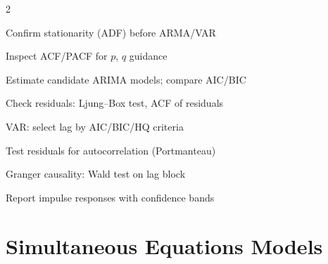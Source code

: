 \documentclass[10pt,a4paper]{article}
\begin{document}
\begin{tcolorbox}[checklist]
\begin{multicols}{2}
\begin{checklist}
  \item Confirm stationarity (ADF) before ARMA/VAR
  \item Inspect ACF/PACF for $p$, $q$ guidance
  \item Estimate candidate ARIMA models; compare AIC/BIC
  \item Check residuals: Ljung--Box test, ACF of residuals
  \item VAR: select lag by AIC/BIC/HQ criteria
  \item Test residuals for autocorrelation (Portmanteau)
  \item Granger causality: Wald test on lag block
  \item Report impulse responses with confidence bands
\end{checklist}
\end{multicols}
\end{tcolorbox}

\newpage

\section{Simultaneous Equations Models}
\end{document}
